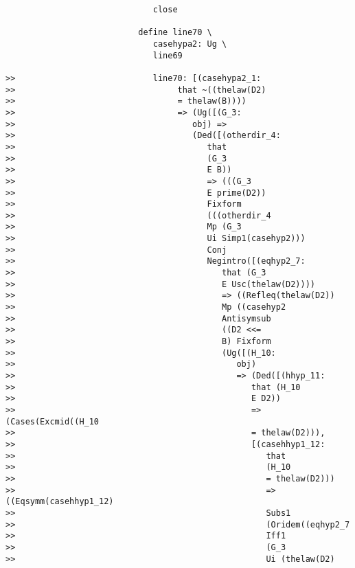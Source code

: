 \documentclass[12pt]{article}
\begin{document}
\begin{verbatim}
                              close

                           define line70 \
                              casehypa2: Ug \
                              line69

>>                            line70: [(casehypa2_1:
>>                                 that ~((thelaw(D2)
>>                                 = thelaw(B))))
>>                                 => (Ug([(G_3:
>>                                    obj) =>
>>                                    (Ded([(otherdir_4:
>>                                       that
>>                                       (G_3
>>                                       E B))
>>                                       => (((G_3
>>                                       E prime(D2))
>>                                       Fixform
>>                                       (((otherdir_4
>>                                       Mp (G_3
>>                                       Ui Simp1(casehyp2)))
>>                                       Conj
>>                                       Negintro([(eqhyp2_7:
>>                                          that (G_3
>>                                          E Usc(thelaw(D2))))
>>                                          => ((Refleq(thelaw(D2))
>>                                          Mp ((casehyp2
>>                                          Antisymsub
>>                                          ((D2 <<=
>>                                          B) Fixform
>>                                          (Ug([(H_10:
>>                                             obj)
>>                                             => (Ded([(hhyp_11:
>>                                                that (H_10
>>                                                E D2))
>>                                                => (Cases(Excmid((H_10
>>                                                = thelaw(D2))),
>>                                                [(casehhyp1_12:
>>                                                   that
>>                                                   (H_10
>>                                                   = thelaw(D2)))
>>                                                   => ((Eqsymm(casehhyp1_12)
>>                                                   Subs1
>>                                                   (Oridem((eqhyp2_7
>>                                                   Iff1
>>                                                   (G_3
>>                                                   Ui (thelaw(D2)

\end{verbatim}
\end{document}
